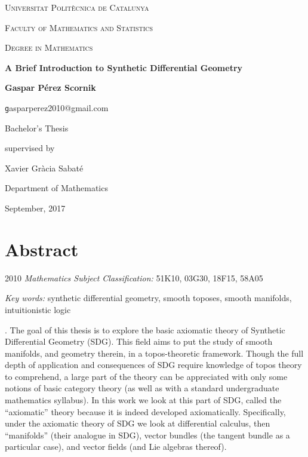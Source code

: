 \documentclass[12pt,twoside]{amsbook}
\begin{document}


\thispagestyle{empty}

\begin{titlepage}
	\centering
	{\scshape\Large Universitat Polit\`ecnica de Catalunya\par}
	\vspace{0.5cm}
	{\scshape\Large Faculty of Mathematics and Statistics\par}
	\vspace{0.5cm}
	{\scshape\Large Degree in Mathematics\par}
	\vspace{1.5cm}
	{\huge\bfseries A Brief Introduction to Synthetic Differential Geometry\par}
	\vspace{2cm}
	{\Large\bfseries Gaspar P\'erez Scornik\par}
	\vspace{0.3cm}
	{\texttt gasparperez2010@gmail.com\par}
	\vfill
	Bachelor's Thesis\par
	supervised by\par
	\vspace{0.3cm}
	Xavier Gr\`acia Sabat\'e\par
  Department of Mathematics

	\vfill

	{\large September, 2017}
\end{titlepage}

\frontmatter
\setcounter{page}{2}
\chapter*{Abstract}
\begin{center}
  2010 {\itshape Mathematics Subject Classification:} 51K10, 03G30, 18F15, 58A05\par
  \vspace{0.3cm}
  {\itshape Key words:} synthetic differential geometry, smooth toposes, smooth manifolds, intuitionistic logic\par
\end{center}

\vspace{0.5cm}

. The goal of this thesis is to explore the basic axiomatic theory of Synthetic Differential Geometry (SDG). This field aims to put the study of smooth manifolds, and geometry therein, in a topos-theoretic framework. Though the full depth of application and consequences of SDG
require knowledge of topos theory to comprehend, a large part of the theory can be appreciated
with only some notions of basic category theory (as well as with a standard undergraduate
mathematics syllabus). In this work we look at this part of SDG, called the “axiomatic” theory
because it is indeed developed axiomatically. Specifically, under the axiomatic theory of SDG
we look at differential calculus, then “manifolds” (their analogue in SDG), vector bundles (the
tangent bundle as a particular case), and vector fields (and Lie algebras thereof).\par
\vspace{0.2cm}
\end{document}
